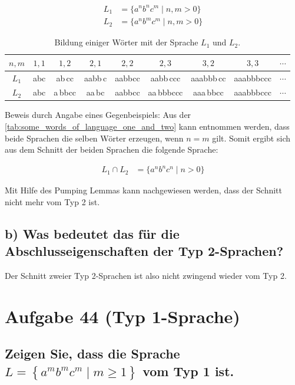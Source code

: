 \documentclass{article}
\begin{document}
\begin{align}
	L_1 &= \{a^n b^n c^m \mid n, m > 0\} \nonumber\\
	L_2 &= \{a^n b^m c^m \mid n, m > 0\} \nonumber
\end{align}

\begin{table}[H]
	\centering
	\begin{tabular}{|c|c|c|c|c|c|c|c|c|}
		\hline
		$n,m$ & $1,1$ & $1,2$ & $2,1$ & $2,2$ & $2,3$ & $3,2$ & $3,3$ & $\cdots$ \\
		\hline
		$L_1$ & abc & ab\,cc & aabb\,c & aabbcc & aabb\,ccc & aaabbb\,cc & aaabbbccc & $\cdots$ \\
		$L_2$ & abc & a\,bbcc & aa\,bc & aabbcc & aa\,bbbccc & aaa\,bbcc & aaabbbccc & $\cdots$ \\
		\hline
	\end{tabular}
	\caption{Bildung einiger Wörter mit der Sprache $L_1$ und $L_2$.}
	\label{tab:some_words_of_language_one_and_two}
\end{table}

Beweis durch Angabe eines Gegenbeispiels: Aus der \autoref{tab:some_words_of_language_one_and_two} kann entnommen werden, dass beide Sprachen die selben Wörter erzeugen, wenn $n=m$ gilt. Somit ergibt sich aus dem Schnitt der beiden Sprachen die folgende Sprache:

\begin{align}
L_1 \cap L_2 &= \{a^n b^n c^n \mid n > 0\} \nonumber
\end{align}

Mit Hilfe des Pumping Lemmas kann nachgewiesen werden, dass der Schnitt nicht mehr vom Typ 2 ist.

\subsection*{b) Was bedeutet das für die Abschlusseigenschaften der Typ 2-Sprachen?}

Der Schnitt zweier Typ 2-Sprachen ist also nicht zwingend wieder vom Typ 2.


\newpage
\section*{Aufgabe 44 (Typ 1-Sprache)}

\subsection*{Zeigen Sie, dass die Sprache $L = \left\{a^m b^m c^m \mid m \geq 1\right\}$ vom Typ 1 ist.}
\end{document}
